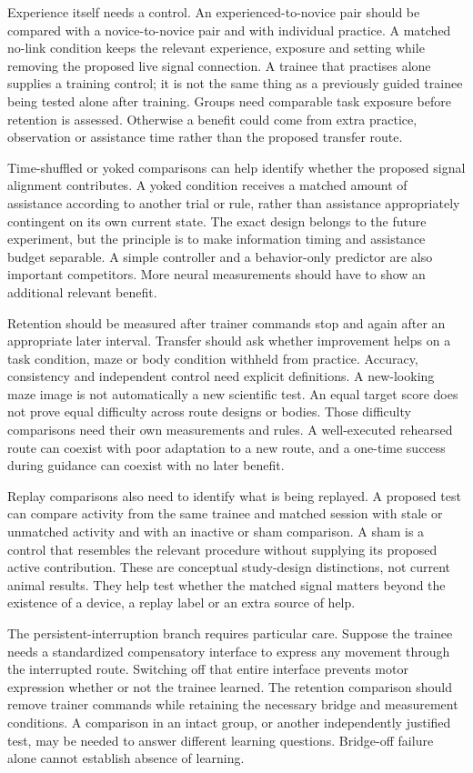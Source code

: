 Experience itself needs a control. An experienced-to-novice pair should be compared with a novice-to-novice pair and with individual practice. A matched no-link condition keeps the relevant experience, exposure and setting while removing the proposed live signal connection. A trainee that practises alone supplies a training control; it is not the same thing as a previously guided trainee being tested alone after training. Groups need comparable task exposure before retention is assessed. Otherwise a benefit could come from extra practice, observation or assistance time rather than the proposed transfer route.

Time-shuffled or yoked comparisons can help identify whether the proposed signal alignment contributes. A yoked condition receives a matched amount of assistance according to another trial or rule, rather than assistance appropriately contingent on its own current state. The exact design belongs to the future experiment, but the principle is to make information timing and assistance budget separable. A simple controller and a behavior-only predictor are also important competitors. More neural measurements should have to show an additional relevant benefit.

Retention should be measured after trainer commands stop and again after an appropriate later interval. Transfer should ask whether improvement helps on a task condition, maze or body condition withheld from practice. Accuracy, consistency and independent control need explicit definitions. A new-looking maze image is not automatically a new scientific test. An equal target score does not prove equal difficulty across route designs or bodies. Those difficulty comparisons need their own measurements and rules. A well-executed rehearsed route can coexist with poor adaptation to a new route, and a one-time success during guidance can coexist with no later benefit.

Replay comparisons also need to identify what is being replayed. A proposed test can compare activity from the same trainee and matched session with stale or unmatched activity and with an inactive or sham comparison. A sham is a control that resembles the relevant procedure without supplying its proposed active contribution. These are conceptual study-design distinctions, not current animal results. They help test whether the matched signal matters beyond the existence of a device, a replay label or an extra source of help.

The persistent-interruption branch requires particular care. Suppose the trainee needs a standardized compensatory interface to express any movement through the interrupted route. Switching off that entire interface prevents motor expression whether or not the trainee learned. The retention comparison should remove trainer commands while retaining the necessary bridge and measurement conditions. A comparison in an intact group, or another independently justified test, may be needed to answer different learning questions. Bridge-off failure alone cannot establish absence of learning.

